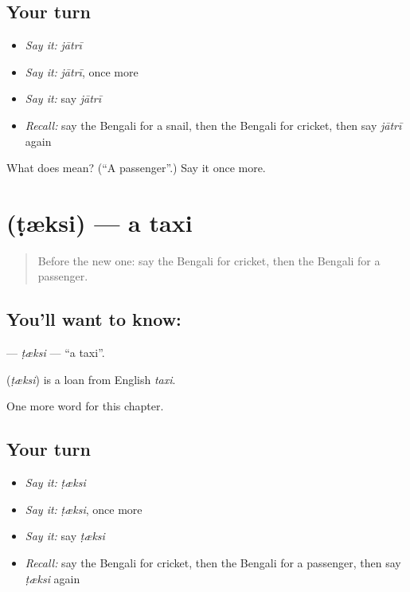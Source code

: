 \subsection*{Your turn}
\begin{itemize}
\raggedright
  \item \emph{Say it:} \emph{jātrī}
  \item \emph{Say it:} \emph{jātrī}, once more
  \item \emph{Say it:} say \emph{jātrī}
  \item \emph{Recall:} say the Bengali for a snail, then the Bengali for cricket, then say \emph{jātrī} again
\end{itemize}

\begin{tcolorbox}[breakable,colback=teal!4,colframe=teal!35!black,title={Before you move on}]
What does  mean? (\textquotedblleft{}A passenger\textquotedblright{}.) Say it once more.
\end{tcolorbox}
\section[\texorpdfstring{\bn{ট্যাক্সি} (ṭæksi)}{ট্যাক্সি (ṭæksi)}]{ (ṭæksi) — a taxi}

\label{lesson:BN-C167-tksi}



\begin{quote}
Before the new one: say the Bengali for cricket, then the Bengali for a passenger.
\end{quote}

\subsection*{You'll want to know: }
\textbf{} — \emph{ṭæksi} — \textquotedblleft{}a taxi\textquotedblright{}.

\begin{cousinweb}
\textbf{} (\emph{ṭæksi}) is a loan from English \emph{taxi}.
\end{cousinweb}

\begin{grammarlens}[title={What you've built}]
One more word for this chapter.
\end{grammarlens}

\subsection*{Your turn}
\begin{itemize}
\raggedright
  \item \emph{Say it:} \emph{ṭæksi}
  \item \emph{Say it:} \emph{ṭæksi}, once more
  \item \emph{Say it:} say \emph{ṭæksi}
  \item \emph{Recall:} say the Bengali for cricket, then the Bengali for a passenger, then say \emph{ṭæksi} again
\end{itemize}

